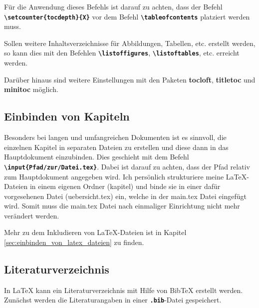 Für die Anwendung dieses Befehls ist darauf zu achten, dass der Befehl \textbf{\texttt{\textbackslash setcounter\{tocdepth\}\{X\}}} vor dem Befehl \textbf{\texttt{\textbackslash tableofcontents}} platziert werden muss.

Sollen weitere Inhaltsverzeichnisse für Abbildungen, Tabellen, etc. erstellt werden, so kann dies mit den Befehlen \textbf{\texttt{\textbackslash listoffigures}}, \textbf{\texttt{\textbackslash listoftables}}, etc. erreicht werden.


Darüber hinaus sind weitere Einstellungen mit den Paketen \textbf{tocloft}, \textbf{titletoc} und \textbf{minitoc} möglich.

\subsection{Einbinden von Kapiteln}
Besonders bei langen und umfangreichen Dokumenten ist es sinnvoll, die einzelnen Kapitel in separaten Dateien zu erstellen und diese dann in das Hauptdokument einzubinden. Dies geschieht mit dem Befehl \textbf{\texttt{\textbackslash input\{Pfad/zur/Datei.tex\}}}. Dabei ist darauf zu achten, dass der Pfad relativ zum Hauptdokument angegeben wird.
Ich persönlich strukturiere meine \LaTeX{}-Dateien in einem eigenen Ordner (kapitel) und binde sie in einer dafür vorgesehenen Datei (uebersicht.tex) ein, welche in der main.tex Datei eingefügt wird. Somit muss die main.tex Datei nach einmaliger Einrichtung nicht mehr verändert werden.

Mehr zu dem Inkludieren von \LaTeX{}-Dateien ist in Kapitel \ref{sec:einbinden_von_latex_dateien} zu finden.


\subsection{Literaturverzeichnis}
In \LaTeX{} kann ein Literaturverzeichnis mit Hilfe von BibTeX erstellt werden.
Zunächst werden die Literaturangaben in einer \textbf{\texttt{.bib}}-Datei gespeichert.

